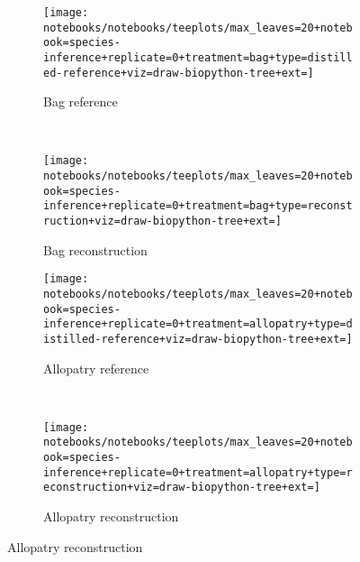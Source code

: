\begin{figure}
  \begin{subfigure}{.45\linewidth}
    \centering
    \texttt{[image: notebooks/notebooks/teeplots/max\_leaves=20+notebook=species-inference+replicate=0+treatment=bag+type=distilled-reference+viz=draw-biopython-tree+ext=]}
    \caption{Bag reference}
    \label{fig:species-example-replicates:bag-reference}
  \end{subfigure}
  \,
  \begin{subfigure}{.45\linewidth}
    \centering
    \texttt{[image: notebooks/notebooks/teeplots/max\_leaves=20+notebook=species-inference+replicate=0+treatment=bag+type=reconstruction+viz=draw-biopython-tree+ext=]}
    \caption{Bag reconstruction}
    \label{fig:species-example-replicates:bag-reconstruction}
  \end{subfigure}

  \begin{subfigure}{.45\linewidth}
    \centering
    \texttt{[image: notebooks/notebooks/teeplots/max\_leaves=20+notebook=species-inference+replicate=0+treatment=allopatry+type=distilled-reference+viz=draw-biopython-tree+ext=]}
    \caption{Allopatry reference}
    \label{fig:species-example-replicates:allopatry-reference}
  \end{subfigure}
  \,
  \begin{subfigure}{.45\linewidth}
    \centering
    \texttt{[image: notebooks/notebooks/teeplots/max\_leaves=20+notebook=species-inference+replicate=0+treatment=allopatry+type=reconstruction+viz=draw-biopython-tree+ext=]}
    \caption{Allopatry reconstruction}
    \label{fig:species-example-replicates:allopatry-reconstruction}
  \end{subfigure}


\end{figure}
